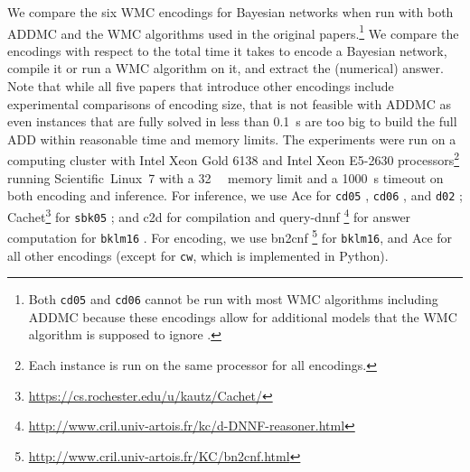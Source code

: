 \documentclass[accepted]{uai2021}
\theoremstyle{definition}
\begin{document}
We compare the six WMC encodings for Bayesian networks when run with both
\textsf{ADDMC} \citep{DBLP:conf/aaai/DudekPV20} and the WMC algorithms used in
the original papers.\footnote{Both \texttt{cd05} and \texttt{cd06} cannot be run
  with most WMC algorithms including \textsf{ADDMC} because these encodings
  allow for additional models that the WMC algorithm is supposed to ignore
  \citep{DBLP:conf/ijcai/ChaviraD05,DBLP:conf/sat/ChaviraD06}.} We compare the
encodings with respect to the total time it takes to encode a Bayesian network,
compile it or run a WMC algorithm on it, and extract the (numerical) answer.
Note that while all five papers that introduce other encodings include
experimental comparisons of encoding size, that is not feasible with
\textsf{ADDMC} as even instances that are fully solved in less than
\SI{0.1}{\second} are too big to build the full ADD within reasonable time and
memory limits. The experiments were run on a computing cluster with Intel Xeon
Gold 6138 and Intel Xeon E5-2630 processors\footnote{Each instance is run on the
  same processor for all encodings.} running Scientific~Linux~7 with a
\SI{32}{\gibi\byte} memory limit and a \SI{1000}{\second} timeout on both
encoding and inference. For inference, we use \textsf{Ace} for \texttt{cd05}
\citep{DBLP:conf/ijcai/ChaviraD05}, \texttt{cd06}
\citep{DBLP:conf/sat/ChaviraD06}, and \texttt{d02}
\citep{DBLP:conf/kr/Darwiche02};
\textsf{Cachet}\footnote{\url{https://cs.rochester.edu/u/kautz/Cachet/}}
\citep{DBLP:conf/sat/SangBBKP04} for \texttt{sbk05}
\citep{DBLP:conf/aaai/SangBK05}; and \textsf{c2d}
\citep{DBLP:conf/ecai/Darwiche04} for compilation and \textsf{query-dnnf}
\footnote{\url{http://www.cril.univ-artois.fr/kc/d-DNNF-reasoner.html}} for
answer computation for \texttt{bklm16} \citep{DBLP:conf/ecai/BartKLM16}. For
encoding, we use \textsf{bn2cnf}
\footnote{\url{http://www.cril.univ-artois.fr/KC/bn2cnf.html}} for
\texttt{bklm16}, and \textsf{Ace} for all other encodings (except for
\texttt{cw}, which is implemented in Python).
\end{document}

